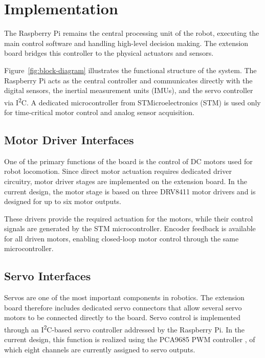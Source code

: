 \documentclass[conference]{IEEEtran}
\begin{document}
	

	\section{Implementation}
	
	The Raspberry Pi remains the central processing unit of the robot, executing the main control software and handling high-level decision making. The extension board bridges this controller to the physical actuators and sensors.
	
	Figure~\ref{fig:block-diagram} illustrates the functional structure of the system. The Raspberry Pi acts as the central controller and communicates directly with the digital sensors, the inertial measurement units (IMUs), and the servo controller via I\textsuperscript{2}C. A dedicated microcontroller from STMicroelectronics (STM) is used only for time-critical motor control and analog sensor acquisition.

	
	\subsection{Motor Driver Interfaces}
	One of the primary functions of the board is the control of DC motors used for robot locomotion. Since direct motor actuation requires dedicated driver circuitry, motor driver stages are implemented on the extension board. In the current design, the motor stage is based on three DRV8411 motor drivers \cite{b10} and is designed for up to six motor outputs.
	
	These drivers provide the required actuation for the motors, while their control signals are generated by the STM microcontroller. Encoder feedback is available for all driven motors, enabling closed-loop motor control through the same microcontroller.
	
	\subsection{Servo Interfaces}
	
	Servos are one of the most important components in robotics.	
	The extension board therefore includes dedicated servo connectors that allow several servo motors to be connected directly to the board. Servo control is implemented through an I\textsuperscript{2}C-based servo controller addressed by the Raspberry Pi. In the current design, this function is realized using the PCA9685 PWM controller \cite{b9}, of which eight channels are currently assigned to servo outputs.
	
\end{document}
